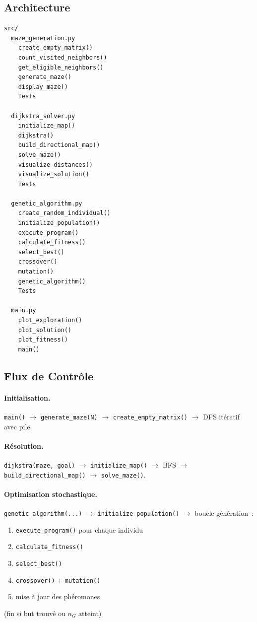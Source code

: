 \documentclass[12pt, a4paper]{article}
\theoremstyle{definition}
\theoremstyle{remark}
\newcommand{\code}[1]{\texttt{#1}}
\begin{document}
\subsection{Architecture}

\begin{lstlisting}
src/
  maze_generation.py
    create_empty_matrix()
    count_visited_neighbors()
    get_eligible_neighbors()
    generate_maze()
    display_maze()
    Tests

  dijkstra_solver.py
    initialize_map()
    dijkstra()
    build_directional_map()
    solve_maze()
    visualize_distances()
    visualize_solution()
    Tests

  genetic_algorithm.py
    create_random_individual()
    initialize_population()
    execute_program()
    calculate_fitness()
    select_best()
    crossover()
    mutation()
    genetic_algorithm()
    Tests

  main.py
    plot_exploration()
    plot_solution()
    plot_fitness()
    main()
\end{lstlisting}

\subsection{Flux de Contrôle}

\paragraph{Initialisation.}
\code{main()} $\rightarrow$ \code{generate\_maze(N)} $\rightarrow$
\code{create\_empty\_matrix()} $\rightarrow$ DFS itératif avec pile.

\paragraph{Résolution.}
\code{dijkstra(maze, goal)} $\rightarrow$ \code{initialize\_map()} $\rightarrow$
BFS $\rightarrow$ \code{build\_directional\_map()} $\rightarrow$
\code{solve\_maze()}.

\paragraph{Optimisation stochastique.}
\code{genetic\_algorithm(...)} $\rightarrow$ \code{initialize\_population()} $\rightarrow$
boucle génération~:
\begin{enumerate}[noitemsep]
    \item \code{execute\_program()} pour chaque individu
    \item \code{calculate\_fitness()}
    \item \code{select\_best()}
    \item \code{crossover()} + \code{mutation()}
    \item mise à jour des phéromones
\end{enumerate}
(fin si but trouvé ou $n_G$ atteint)
\end{document}
